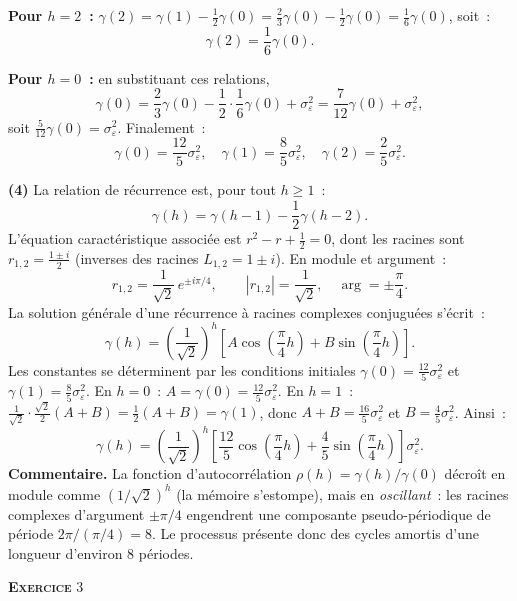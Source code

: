 \documentclass[11pt,a4paper,notitlepage]{article}
\newcommand{\exercice}[1]{\textsc{\textbf{Exercice}} #1}
\newcommand{\question}[1]{\textbf{(#1)}}
\begin{document}
\textbf{Pour $h=2$~:} $\gamma(2) = \gamma(1) - \frac{1}{2}\gamma(0) =
\frac{2}{3}\gamma(0) - \frac{1}{2}\gamma(0) = \frac{1}{6}\gamma(0)$,
soit~:
\[
\gamma(2) = \frac{1}{6}\gamma(0).
\]

\textbf{Pour $h=0$~:} en substituant ces relations,
\[
\gamma(0) = \frac{2}{3}\gamma(0) - \frac{1}{2}\cdot\frac{1}{6}\gamma(0)
+ \sigma_{\varepsilon}^2
= \frac{7}{12}\gamma(0) + \sigma_{\varepsilon}^2,
\]
soit $\frac{5}{12}\gamma(0) = \sigma_{\varepsilon}^2$. Finalement~:
\[
\gamma(0) = \frac{12}{5}\sigma_{\varepsilon}^2,\quad
\gamma(1) = \frac{8}{5}\sigma_{\varepsilon}^2,\quad
\gamma(2) = \frac{2}{5}\sigma_{\varepsilon}^2.
\]
\newline

\question{4} La relation de récurrence est, pour tout $h\geq 1$~:
\[
\gamma(h) = \gamma(h-1) - \frac{1}{2}\gamma(h-2).
\]
L'équation caractéristique associée est $r^2 - r + \frac{1}{2} = 0$,
dont les racines sont $r_{1,2} = \frac{1\pm i}{2}$ (inverses des racines
$L_{1,2}=1\pm i$). En module et argument~:
\[
r_{1,2} = \frac{1}{\sqrt 2}\,e^{\pm i\pi/4},\qquad
|r_{1,2}| = \frac{1}{\sqrt 2},\quad \arg = \pm\frac{\pi}{4}.
\]
La solution générale d'une récurrence à racines complexes conjuguées
s'écrit~:
\[
\gamma(h) = \left(\frac{1}{\sqrt 2}\right)^{h}
\left[A\cos\!\left(\frac{\pi}{4}h\right) + B\sin\!\left(\frac{\pi}{4}h\right)\right].
\]
Les constantes se déterminent par les conditions initiales $\gamma(0) =
\frac{12}{5}\sigma_{\varepsilon}^2$ et $\gamma(1) =
\frac{8}{5}\sigma_{\varepsilon}^2$. En $h=0$~: $A = \gamma(0) =
\frac{12}{5}\sigma_{\varepsilon}^2$. En $h=1$~: $\frac{1}{\sqrt 2}
\cdot\frac{\sqrt 2}{2}(A+B) = \frac{1}{2}(A+B) = \gamma(1)$, donc $A+B =
\frac{16}{5}\sigma_{\varepsilon}^2$ et $B =
\frac{4}{5}\sigma_{\varepsilon}^2$. Ainsi~:
\[
\gamma(h) = \left(\frac{1}{\sqrt 2}\right)^{h}
\left[\frac{12}{5}\cos\!\left(\frac{\pi}{4}h\right)
+ \frac{4}{5}\sin\!\left(\frac{\pi}{4}h\right)\right]\sigma_{\varepsilon}^2.
\]
\textbf{Commentaire.} La fonction d'autocorrélation $\rho(h) =
\gamma(h)/\gamma(0)$ décroît en module comme $(1/\sqrt 2)^h$ (la
mémoire s'estompe), mais en \emph{oscillant}~: les racines complexes
d'argument $\pm\pi/4$ engendrent une composante pseudo-périodique de
période $2\pi/(\pi/4) = 8$. Le processus présente donc des cycles
amortis d'une longueur d'environ 8 périodes.

\bigskip

\exercice{3}\newline
\end{document}
